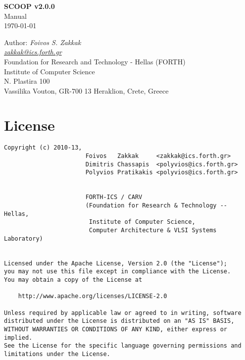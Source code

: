\documentclass[
a4paper,
12pt,
]{article}
\def\scoopversion{2.0.0}
\begin{document}
\begin{titlepage}
\begin{center}

  \vspace*{5cm}

  \LARGE \textbf{SCOOP v\scoopversion\\}
  Manual\\[0.5cm]
  \large \today

  \vfill

  \large Author:
  {\textit{Foivos S. Zakkak}}\\
  \href{mailto:zakkak@ics.forth.gr}{\textit{zakkak@ics.forth.gr}}\\[1cm]

  Foundation for Research and Technology - Hellas (FORTH)\\
  Institute of Computer Science\\
  N. Plastira 100\\
  Vassilika Vouton, GR-700 13 Heraklion, Crete, Greece\\[0.5cm]

\end{center}

\end{titlepage}

\pagestyle{plain}

\section*{License}

\begin{verbatim}
Copyright (c) 2010-13,
                       Foivos   Zakkak     <zakkak@ics.forth.gr>
                       Dimitris Chassapis  <polyvios@ics.forth.gr>
                       Polyvios Pratikakis <polyvios@ics.forth.gr>


                       FORTH-ICS / CARV
                       (Foundation for Research & Technology -- Hellas,
                        Institute of Computer Science,
                        Computer Architecture & VLSI Systems Laboratory)


Licensed under the Apache License, Version 2.0 (the "License");
you may not use this file except in compliance with the License.
You may obtain a copy of the License at

    http://www.apache.org/licenses/LICENSE-2.0

Unless required by applicable law or agreed to in writing, software
distributed under the License is distributed on an "AS IS" BASIS,
WITHOUT WARRANTIES OR CONDITIONS OF ANY KIND, either express or implied.
See the License for the specific language governing permissions and
limitations under the License.
\end{verbatim}
\end{document}
